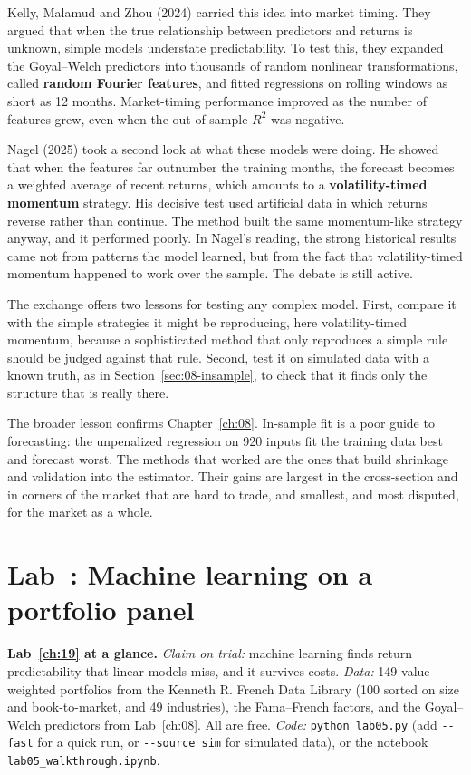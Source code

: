 Kelly, Malamud and Zhou (2024) carried this idea into market timing. They argued that when the true relationship between predictors and returns is unknown, simple models understate predictability. To test this, they expanded the Goyal--Welch predictors into thousands of random nonlinear transformations, called \textbf{random Fourier features}, and fitted regressions on rolling windows as short as 12 months. Market-timing performance improved as the number of features grew, even when the out-of-sample $R^2$ was negative.

Nagel (2025) took a second look at what these models were doing. He showed that when the features far outnumber the training months, the forecast becomes a weighted average of recent returns, which amounts to a \textbf{volatility-timed momentum} strategy. His decisive test used artificial data in which returns reverse rather than continue. The method built the same momentum-like strategy anyway, and it performed poorly. In Nagel's reading, the strong historical results came not from patterns the model learned, but from the fact that volatility-timed momentum happened to work over the sample. The debate is still active.

The exchange offers two lessons for testing any complex model. First, compare it with the simple strategies it might be reproducing, here volatility-timed momentum, because a sophisticated method that only reproduces a simple rule should be judged against that rule. Second, test it on simulated data with a known truth, as in Section~\ref{sec:08-insample}, to check that it finds only the structure that is really there.

The broader lesson confirms Chapter~\ref{ch:08}. In-sample fit is a poor guide to forecasting: the unpenalized regression on 920 inputs fit the training data best and forecast worst. The methods that worked are the ones that build shrinkage and validation into the estimator. Their gains are largest in the cross-section and in corners of the market that are hard to trade, and smallest, and most disputed, for the market as a whole.


\section{Lab~\thechapter: Machine learning on a portfolio panel}
\label{sec:19-lab}

\begin{callout}
\textbf{Lab~\ref{ch:19} at a glance.} \emph{Claim on trial:} machine learning finds return predictability that linear models miss, and it survives costs. \emph{Data:} 149 value-weighted portfolios from the Kenneth R. French Data Library (100 sorted on size and book-to-market, and 49 industries), the Fama--French factors, and the Goyal--Welch predictors from Lab~\ref{ch:08}. All are free. \emph{Code:} \texttt{python lab05.py} (add \texttt{-{}-fast} for a quick run, or \texttt{-{}-source sim} for simulated data), or the notebook \texttt{lab05\_walkthrough.ipynb}.
\end{callout}

